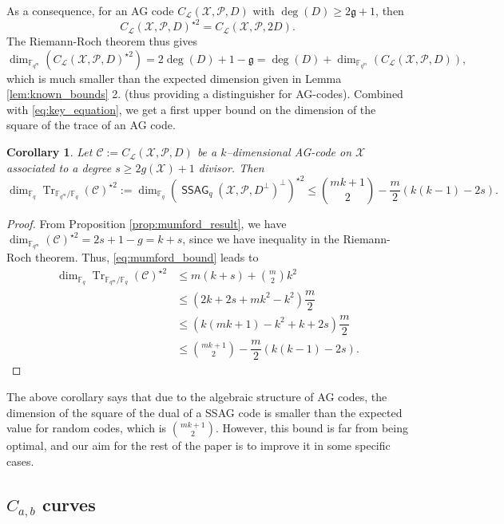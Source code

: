 \documentclass[a4paper]{article}
\newtheorem{coro}[thm]{Corollary}
\theoremstyle{definition}
\theoremstyle{remark}
\newcommand{\calP}{\mathcal{P}}
\newcommand{\calL}{\mathcal{L}}
\newcommand{\calC}{\mathcal{C}}
\newcommand{\calX}{\mathcal{X}}
\newcommand{\fqm}{\mathbb{F}_{q^m}}
\newcommand{\fq}{\mathbb{F}_{q}}
\newcommand{\Tr}[1]{\operatorname{Tr}_{\mathbb{F}_{q^m}/\fq}\left(#1\right)}
\newcommand{\ssag}[1]{\operatorname{\mathsf{SSAG}}_{q}\left(#1\right)}
\begin{document}
\noindent As a consequence, for an AG code  $C_{\calL}(\calX,\mathcal{P},D)$ with $\deg(D) \geq 2\mathfrak{g}+1$, then 
\[ C_{\calL}(\calX,\mathcal{P},D)^{\star2} = C_{\calL}(\calX,\calP,2D).\]
The Riemann-Roch theorem thus gives
\[ \dim_{\fqm}(C_{\calL}(\calX,\mathcal{P},D)^{\star2}) = 2\deg(D)+1-\mathfrak{g}= \deg(D) + \dim_{\fqm}(C_{\calL}(\calX,\mathcal{P},D)), \]
which is much smaller than the expected dimension given in Lemma \ref{lem:known_bounds} 2. (thus providing a distinguisher for AG-codes). Combined with \eqref{eq:key_equation}, we get a first upper bound on the dimension of the square of the trace of an AG code.


\begin{coro} \label{coro:1st_bound_mumford}
	Let $\mathcal{C} := C_{\calL}(\calX,\mathcal{P},D)$ be a $k$--dimensional AG-code on $\calX$ associated to a degree $s \geq 2g(\calX)+1$ divisor. Then
	\[ \dim_{\fq}\Tr{\calC}^{\star2} := \dim_{\fq} (\ssag{\calX,\calP,D^{\perp}}^{\perp})^{\star2}  \leq \binom{mk+1}{2} - \dfrac{m}{2} (k(k-1)-2s).\]
\end{coro}


\begin{proof}
	From Proposition \ref{prop:mumford_result}, we have $\dim_{\fqm}(\calC)^{\star2} = 2s+1-g = k+s$, since we have inequality in the Riemann-Roch theorem. Thus, \eqref{eq:mumford_bound} leads to
	\begin{align*}
		\dim_{\fq}\Tr{\calC}^{\star2} &\leq m(k+s) + \binom{m}{2}k^2 \\
		&\leq (2k+2s+mk^2-k^2) \dfrac{m}{2} \\
		&\leq (k(mk+1)-k^2+k+2s) \dfrac{m}{2} \\
		&\leq \binom{mk+1}{2} - \dfrac{m}{2}(k(k-1)-2s) .
	\end{align*}
\end{proof}

The above corollary says that due to the algebraic structure of AG codes, the dimension of the square of the dual of a SSAG code is smaller than the expected value for random codes, which is $\binom{mk+1}{2}$. However, this bound is far from being optimal, and our aim for the rest of the paper is to improve it in some specific cases. 





\subsection{$C_{a,b}$ curves} \label{section:C_a,b_codes}
\end{document}
